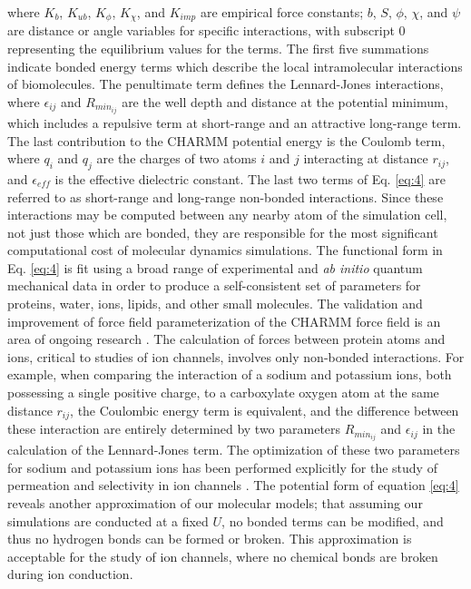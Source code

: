 \begin{refsection}
where $K_b$, $K_{ub}$, $K_{\phi}$, $K_{\chi}$, and $K_{imp}$ are empirical force constants; $b$, $S$, $\phi$, $\chi$, and $\psi$ are distance or angle variables for specific interactions, with subscript $0$ representing the equilibrium values for the terms. The first five summations indicate bonded energy terms which describe the local intramolecular interactions of biomolecules. The penultimate term defines the Lennard-Jones interactions, where $\epsilon_{ij}$ and $R_{min_{ij}}$ are the well depth and distance at the potential minimum, which includes a repulsive term at short-range and an attractive long-range term. The last contribution to the CHARMM potential energy is the Coulomb term, where $q_i$ and $q_j$ are the charges of two atoms $i$ and $j$ interacting at distance $r_{ij}$, and $\epsilon_{eff}$ is the effective dielectric constant. The last two terms of Eq. \ref{eq:4} are referred to as short-range and long-range non-bonded interactions. Since these interactions may be computed between any nearby atom of the simulation cell, not just those which are bonded, they are responsible for the most significant computational cost of molecular dynamics simulations. The functional form in Eq. \ref{eq:4} is fit using a broad range of experimental and \textit{ab initio} quantum mechanical data in order to produce a self-consistent set of parameters for proteins, water, ions, lipids, and other small molecules. The validation and improvement of force field parameterization of the CHARMM force field is an area of ongoing research \cite{Huang:2013ft,Huang:2016kb}. The calculation of forces between protein atoms and ions, critical to studies of ion channels, involves only non-bonded interactions. For example, when comparing the interaction of a sodium and potassium ions, both possessing a single positive charge, to a carboxylate oxygen atom at the same distance $r_{ij}$, the Coulombic energy term is equivalent, and the difference between these interaction are entirely determined by two parameters $R_{min_{ij}}$ and $\epsilon_{ij}$ in the calculation of the Lennard-Jones term. The optimization of these two parameters for sodium and potassium ions has been performed explicitly for the study of permeation and selectivity in ion channels \cite{Noskov:2008jp}. The potential form of equation \ref{eq:4} reveals another approximation of our molecular models; that assuming our simulations are conducted at a fixed $U$, no bonded terms can be modified, and thus no hydrogen bonds can be formed or broken. This approximation is acceptable for the study of ion channels, where no chemical bonds are broken during ion conduction. 


\end{refsection}
